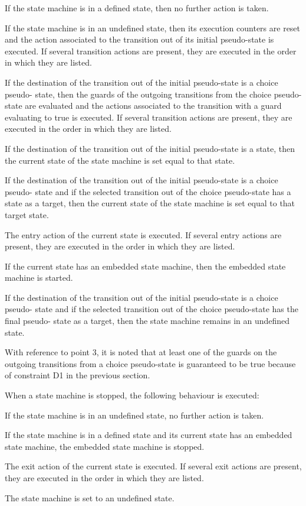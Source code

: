 \begin{fw_enumerate}
\item If the state machine is in a defined state, then no further action is taken.
\item If the state machine is in an undefined state, then its execution counters are reset
and the action associated to the transition
out of its initial pseudo-state is executed. If several transition actions are present, they
are executed in the order in which they are listed.
\item If the destination of the transition out of the initial pseudo-state is a choice pseudo-
state, then the guards of the outgoing transitions from the choice pseudo-state are
evaluated and the actions associated to the transition with a guard evaluating to true is
executed. If several transition actions are present, they are executed in the order in
which they are listed.
\item If the destination of the transition out of the initial pseudo-state is a state, then the
current state of the state machine is set equal to that state.
\item If the destination of the transition out of the initial pseudo-state is a choice pseudo-
state and if the selected transition out of the choice pseudo-state has a state as a target,
then the current state of the state machine is set equal to that target state.
\item The entry action of the current state is executed. If several entry actions are present,
they are executed in the order in which they are listed.
\item If the current state has an embedded state machine, then the embedded state machine is
started.
\item If the destination of the transition out of the initial pseudo-state is a choice pseudo-
state and if the selected transition out of the choice pseudo-state has the final pseudo-
state as a target, then the state machine remains in an undefined state.
\end{fw_enumerate}

With reference to point 3, it is noted that at least one of the guards on the outgoing transitions from a choice pseudo-state is guaranteed to be true 
because of constraint D1 in the previous section.

When a state machine is stopped, the following behaviour is executed:

\begin{fw_enumerate}
\item If the state machine is in an undefined state, no further action is taken.
\item If the state machine is in a defined state and its current state has an embedded state machine, the embedded state machine is stopped.
\item The exit action of the current state is executed. If several exit actions are present, they are executed in the order in which they are listed.
\item The state machine is set to an undefined state.
\end{fw_enumerate}

